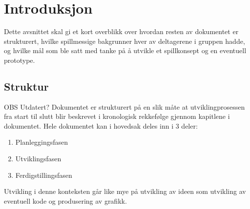 \section{Introduksjon}
Dette avsnittet skal gi et kort overblikk over hvordan resten av
dokumentet er strukturert, hvilke spillmessige bakgrunner hver av
deltagerene i gruppen hadde, og hvilke mål som ble satt med tanke på å
utvikle et spillkonsept og en eventuell prototype.
\subsection{Struktur}
OBS Utdatert?
Dokumentet er strukturert på en slik måte at utviklingprosessen fra
start til slutt blir beskrevet i kronologisk rekkefølge gjennom
kapitlene i dokumentet. Hele dokumentet kan i hovedsak deles inn i 3
deler:
\begin{enumerate}
	\item Planleggingsfasen
	\item Utviklingsfasen
	\item Ferdigstillingsfasen
\end{enumerate}
Utvikling i denne konteksten går like mye på utvikling av ideen som
utvikling av eventuell kode og produsering av grafikk.
